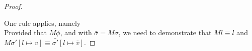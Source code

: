 \begin{proof}
{  %
  }

  {One rule applies, namely \\
  Provided that $M\phi$, and  with $\bar{\sigma}=M\sigma$,
  we need to demonstrate that $M l \equiv l$ and $M\sigma'[l\mapsto v]\equiv\bar{\sigma'}[l\mapsto\bar{v}]$.

}
\end{proof}
